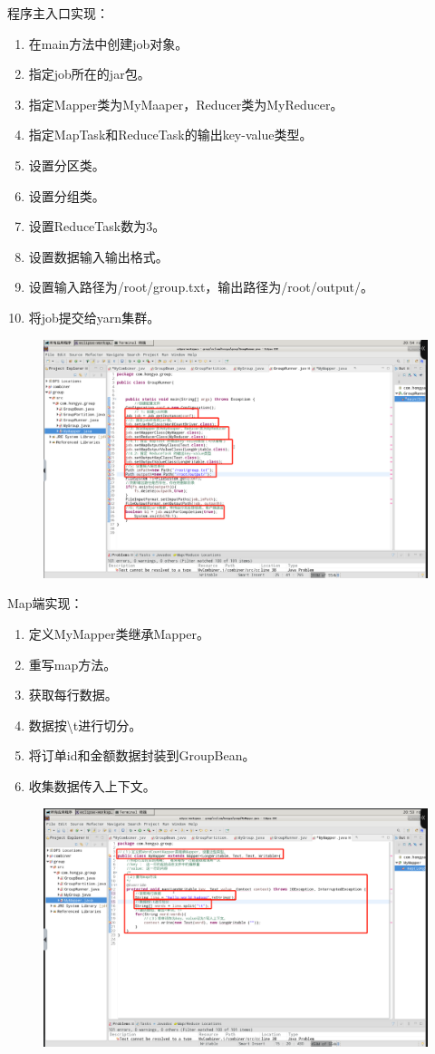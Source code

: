 \documentclass {article}
\begin{document}
				程序主入口实现：
				\begin{enumerate}
					\item 在main方法中创建job对象。
					\item 指定job所在的jar包。
					\item 指定Mapper类为MyMaaper，Reducer类为MyReducer。
					\item 指定MapTask和ReduceTask的输出key-value类型。
					\item 设置分区类。
					\item 设置分组类。
					\item 设置ReduceTask数为3。
					\item 设置数据输入输出格式。
					\item 设置输入路径为/root/group.txt，输出路径为/root/output/。
					\item 将job提交给yarn集群。
				\end{enumerate}
				\begin{figure}[H]
					\centering
					\includegraphics[width=4.5in]{figures/fig24.jpg}
				\end{figure}
			
				Map端实现：
				\begin{enumerate}
					\item 定义MyMapper类继承Mapper。
					\item 重写map方法。
					\item 获取每行数据。
					\item 数据按\textbackslash{}t进行切分。
					\item 将订单id和金额数据封装到GroupBean。
					\item 收集数据传入上下文。
				\end{enumerate}
				\begin{figure}[H]
					\centering
					\includegraphics[width=4.5in]{figures/fig25.jpg}
				\end{figure}
			
\end{document}
